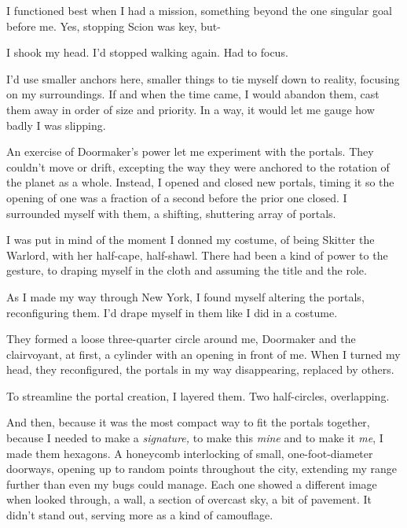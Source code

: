 I functioned best when I had a mission, something beyond the one singular goal before me.  Yes, stopping Scion was key, but-



I shook my head.  I'd stopped walking again.  Had to focus.



I'd use smaller anchors here, smaller things to tie myself down to reality, focusing on my surroundings.  If and when the time came, I would abandon them, cast them away in order of size and priority.  In a way, it would let me gauge how badly I was slipping.



An exercise of Doormaker's power let me experiment with the portals.  They couldn't move or drift, excepting the way they were anchored to the rotation of the planet as a whole.  Instead, I opened and closed new portals, timing it so the opening of one was a fraction of a second before the prior one closed.  I surrounded myself with them, a shifting, shuttering array of portals.



I was put in mind of the moment I donned my costume, of being Skitter the Warlord, with her half-cape, half-shawl.  There had been a kind of power to the gesture, to draping myself in the cloth and assuming the title and the role.



As I made my way through New York, I found myself altering the portals, reconfiguring them.  I'd drape myself in them like I did in a costume.



They formed a loose three-quarter circle around me, Doormaker and the clairvoyant, at first, a cylinder with an opening in front of me.  When I turned my head, they reconfigured, the portals in my way disappearing, replaced by others.



To streamline the portal creation, I layered them.  Two half-circles, overlapping.



And then, because it was the most compact way to fit the portals together, because I needed to make a \emph{signature, } to make this \emph{mine} and to make it \emph{me}, I made them hexagons.  A honeycomb interlocking of small, one-foot-diameter doorways, opening up to random points throughout the city, extending my range further than even my bugs could manage.  Each one showed a different image when looked through, a wall, a section of overcast sky, a bit of pavement.  It didn't stand out, serving more as a kind of camouflage.



